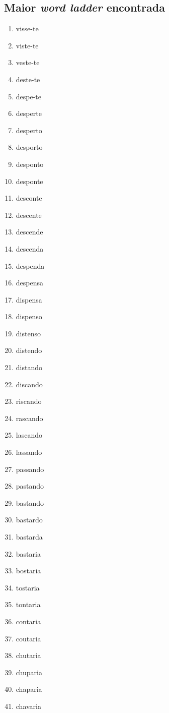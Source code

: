 \documentclass[portuguese,11pt,a4paper,titlepage]{article}
\newcommand{\foreign}[1]{\textit{#1}}
\begin{document}
\subsection{Maior \foreign{word ladder} encontrada}
\begin{multicols}{3}
\begin{enumerate}
	\item visse-te
	\item viste-te
	\item veste-te
	\item deste-te
	\item despe-te
	\item desperte
	\item desperto
	\item desporto
	\item desponto
	\item desponte
	\item desconte
	\item descente
	\item descende
	\item descenda
	\item despenda
	\item despensa
	\item dispensa
	\item dispenso
	\item distenso
	\item distendo
	\item distando
	\item discando
	\item riscando
	\item rascando
	\item lascando
	\item lassando
	\item passando
	\item pastando
	\item bastando
	\item bastardo
	\item bastarda
	\item bastaria
	\item bostaria
	\item tostaria
	\item tontaria
	\item contaria
	\item coutaria
	\item chutaria
	\item chuparia
	\item chaparia
	\item chavaria

\end{enumerate}
\end{multicols}
\end{document}
